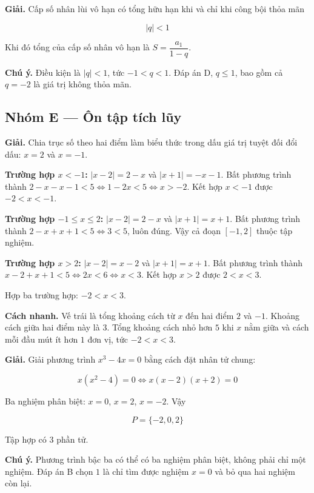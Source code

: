 \documentclass[11pt, a4paper]{article}
\begin{document}
\begin{dapan}[23 — Đáp án C]
\textbf{Giải.} Cấp số nhân lùi vô hạn có tổng hữu hạn khi và chỉ khi công bội thỏa mãn

$$|q| < 1$$

Khi đó tổng của cấp số nhân vô hạn là $S = \dfrac{a_1}{1-q}$.

\textbf{Chú ý.} Điều kiện là $|q| < 1$, tức $-1 < q < 1$. Đáp án D, $q \le 1$, bao gồm cả $q = -2$ là giá trị không thỏa mãn.
\end{dapan}

\subsection*{Nhóm E — Ôn tập tích lũy}

\begin{dapan}[24 — Đáp án C]
\textbf{Giải.} Chia trục số theo hai điểm làm biểu thức trong dấu giá trị tuyệt đối đổi dấu: $x = 2$ và $x = -1$.

\textbf{Trường hợp $x < -1$:} $|x-2| = 2-x$ và $|x+1| = -x-1$. Bất phương trình thành $2 - x - x - 1 < 5 \iff 1 - 2x < 5 \iff x > -2$. Kết hợp $x < -1$ được $-2 < x < -1$.

\textbf{Trường hợp $-1 \le x \le 2$:} $|x-2| = 2-x$ và $|x+1| = x+1$. Bất phương trình thành $2 - x + x + 1 < 5 \iff 3 < 5$, luôn đúng. Vậy cả đoạn $[-1, 2]$ thuộc tập nghiệm.

\textbf{Trường hợp $x > 2$:} $|x-2| = x-2$ và $|x+1| = x+1$. Bất phương trình thành $x - 2 + x + 1 < 5 \iff 2x < 6 \iff x < 3$. Kết hợp $x > 2$ được $2 < x < 3$.

Hợp ba trường hợp: $-2 < x < 3$.

\textbf{Cách nhanh.} Vế trái là tổng khoảng cách từ $x$ đến hai điểm $2$ và $-1$. Khoảng cách giữa hai điểm này là $3$. Tổng khoảng cách nhỏ hơn $5$ khi $x$ nằm giữa và cách mỗi đầu mút ít hơn $1$ đơn vị, tức $-2 < x < 3$.
\end{dapan}

\begin{dapan}[25 — Đáp án D]
\textbf{Giải.} Giải phương trình $x^3 - 4x = 0$ bằng cách đặt nhân tử chung:

$$x(x^2 - 4) = 0 \iff x(x-2)(x+2) = 0$$

Ba nghiệm phân biệt: $x = 0$, $x = 2$, $x = -2$. Vậy

$$P = \{-2, 0, 2\}$$

Tập hợp có $3$ phần tử.

\textbf{Chú ý.} Phương trình bậc ba có thể có ba nghiệm phân biệt, không phải chỉ một nghiệm. Đáp án B chọn $1$ là chỉ tìm được nghiệm $x = 0$ và bỏ qua hai nghiệm còn lại.
\end{dapan}
\end{document}
